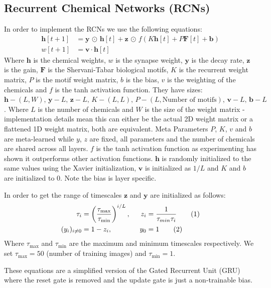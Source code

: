 \documentclass[a4paper, 11pt, oneside]{report}
\newcommand{\sdot}{\, {\scriptscriptstyle \odot}\, }
\newcommand\numberthis{\addtocounter{equation}{1}\tag{\theequation}}
\begin{document}
\subsection*{Recurrent Chemical Networks (RCNs)}

In order to implement the RCNs we use the following equations:
\begin{align}
    \mathbf{h}[t+1] &= \mathbf{y} \sdot \mathbf{h}[t] + \mathbf{z} \sdot f(K\mathbf{h}[t] + P\mathbf{F}[t] + \mathbf{b}) \label{eq5} \\
    w[t+1] &= \mathbf{v} \cdot \mathbf{h}[t] \label{eq6}
\end{align}
Where $\mathbf{h}$ is the chemical weights, $w$ is the synapse weight, $\mathbf{y}$ is the decay rate, $\mathbf{z}$ is the gain, $\mathbf{F}$ is the Shervani-Tabar biological motifs, $K$ is the recurrent weight matrix, $P$ is the motif weight matrix, $b$ is the bias, $v$ is the weighting of the chemicals
and $f$ is the tanh activation function.
They have sizes: $\mathbf{h} - (L, W), \, \mathbf{y} - L, \, \mathbf{z} - L, \, K - (L, L), \, P - (L, \text{Number of motifs}), \, \mathbf{v} -  L, \, \mathbf{b} - L$.
Where $L$ is the number of chemicals and $W$ is the size of the weight matrix - implementation details mean this can 
either be the actual 2D weight matrix or a flattened 1D weight matrix, both are equivalent.
Meta Parameters $P$, $K$, $v$ and $b$ are meta-learned while $y$, $z$ are fixed, all parameters and the number of chemicals are shared across all layers.
$f$ is the tanh activation function as experimenting has shown it outperforms other activation functions.
$\mathbf{h}$ is randomly initialized to the same values using the Xavier initialization,
$\mathbf{v}$ is initialized as $1/L$ and $K$ and $b$ are initialized to 0. Note the bias is layer specific.

In order to get the range of timescales $\mathbf{z}$ and $\mathbf{y}$ are initialized as follows:
\begin{alignat*}{2}
    \tau_i &= \left( {\frac{\tau_{\max}}{\tau_{\min}}} \right)^{i/L}, \, \, \, &z_i &= \frac{1}{\tau_{min}\tau_i} \numberthis\\
    (y_i)_{i \ne 0} &= 1 - z_i, &y_0 &= 1 \numberthis
\end{alignat*}
Where $\tau_{\max}$ and $\tau_{\min}$ are the maximum and minimum timescales respectively.
We set $\tau_{\max} = 50$ (number of training images) and $\tau_{\min} = 1$.

These equations are a simplified version of the Gated Recurrent Unit (GRU) \cite{cho2014} where the reset gate is removed 
and the update gate is just a non-trainable bias.
\end{document}
